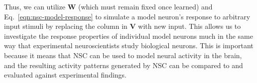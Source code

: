 Thus, we can utilize \textbf{W} 
(which must remain fixed once learned)
and Eq.~\ref{eqn:nsc-model-response}
to simulate a model neuron's response to arbitrary input stimuli
by replacing the column in \textbf{V} with new input.
This allows us to investigate the response properties 
of individual model neurons
much in the same way that experimental neuroscientists 
study biological neurons.
This is important because it means that \ac{NSC} can be used to 
model neural activity in the brain, 
and the resulting activity patterns generated by \ac{NSC}
can be compared to and evaluated against experimental findings. 

